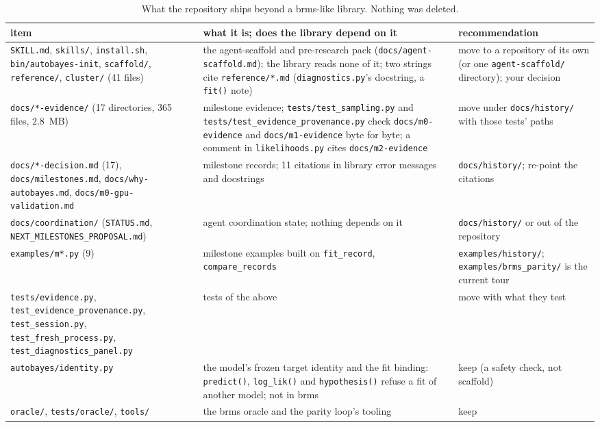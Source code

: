 \documentclass[11pt]{article}
\newcommand{\code}[1]{\texttt{#1}}
\newcommand{\file}[1]{\texttt{#1}}
\begin{document}
\begin{table}[tbp]
\footnotesize
\begin{center}\begin{tabular}{@{}L{0.27\textwidth}L{0.40\textwidth}L{0.25\textwidth}@{}}
\toprule
item & what it is; does the library depend on it & recommendation \\
\midrule
\file{SKILL.md}, \file{skills/}, \file{install.sh}, \file{bin/autobayes-init}, \file{scaffold/}, \file{reference/},
\file{cluster/} (41 files) & the agent-scaffold and pre-research pack (\file{docs/agent-scaffold.md}); the library reads
none of it; two strings cite \file{reference/*.md} (\file{diagnostics.py}'s docstring, a \code{fit()} note) &
move to a repository of its own (or one \file{agent-scaffold/} directory); your decision \\
\file{docs/*-evidence/} (17 directories, 365 files, 2.8~MB) & milestone evidence; \file{tests/test\_sampling.py} and
\file{tests/test\_evidence\_provenance.py} check \file{docs/m0-evidence} and \file{docs/m1-evidence} byte for byte; a comment
in \file{likelihoods.py} cites \file{docs/m2-evidence} & move under \file{docs/history/} with those tests' paths \\
\file{docs/*-decision.md} (17), \file{docs/milestones.md}, \file{docs/why-autobayes.md}, \file{docs/m0-gpu-\allowbreak validation.md} &
milestone records; 11 citations in library error messages and docstrings & \file{docs/history/}; re-point the citations \\
\file{docs/coordination/} (\file{STATUS.md}, \file{NEXT\_MILESTONES\_\allowbreak PROPOSAL.md}) & agent coordination state; nothing
depends on it & \file{docs/history/} or out of the repository \\
\file{examples/m*.py} (9) & milestone examples built on \code{fit\_record}, \code{compare\_records} & \file{examples/history/};
\file{examples/brms\_parity/} is the current tour \\
\file{tests/evidence.py}, \file{test\_evidence\_\allowbreak provenance.py}, \file{test\_session.py}, \file{test\_fresh\_process.py},
\file{test\_diagnostics\_\allowbreak panel.py} & tests of the above & move with what they test \\
\file{autobayes/identity.py} & the model's frozen target identity and the fit binding: \code{predict()}, \code{log\_lik()}
and \code{hypothesis()} refuse a fit of another model; not in brms & keep (a safety check, not scaffold) \\
\file{oracle/}, \file{tests/oracle/}, \file{tools/} & the brms oracle and the parity loop's tooling & keep \\
\bottomrule
\end{tabular}\end{center}
\caption{\small What the repository ships beyond a brms-like library. Nothing was deleted.}\label{tab:extraneous}
\end{table}
\end{document}
